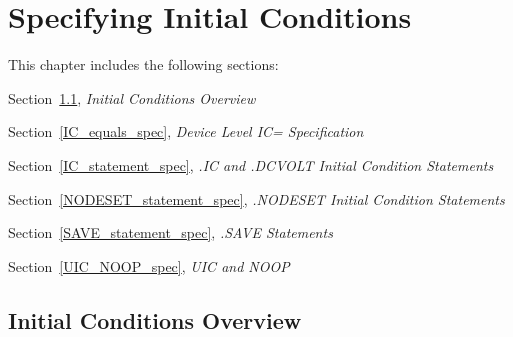 



\chapter{Specifying Initial Conditions}
\label{IC_Chap}


{
This chapter includes the following sections:
\begin{XyceItemize}
\item Section~\ref{IC_Overview}, {\em Initial Conditions Overview}
\item Section~\ref{IC_equals_spec}, {\em Device Level IC= Specification}
\item Section~\ref{IC_statement_spec}, {\em .IC and .DCVOLT Initial Condition Statements}
\item Section~\ref{NODESET_statement_spec}, {\em .NODESET Initial Condition Statements}
\item Section~\ref{SAVE_statement_spec}, {\em .SAVE Statements}
\item Section~\ref{UIC_NOOP_spec}, {\em UIC and NOOP}
\end{XyceItemize}
}

\section{Initial Conditions Overview}
\label{IC_Overview}

